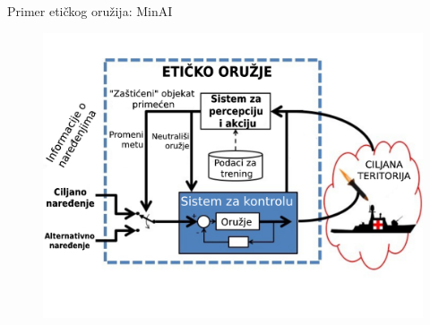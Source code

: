 \documentclass[14pt, aspectratio=169]{beamer}
\begin{document}
\begin{frame}{Primer etičkog oružija: MinAI}
    \begin{figure}[h!]
        \begin{center}
            \includegraphics[scale=0.2]{minAI_slideovi.jpg}
        \end{center}
        \label{fig:minAI}
    \end{figure}
\end{frame}
\end{document}
